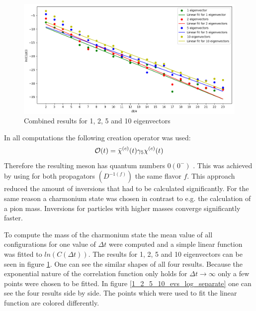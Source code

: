     \begin{figure}[H]
        \centering
        \includegraphics[width=1\textwidth]{images/1_2_5_10_evs_log.png}
        \caption{Combined results for 1, 2, 5 and 10 eigenvectors}
        \label{1_2_5_10_evs_log}
    \end{figure}
    
    \noindent
    In all computations the following creation operator was used:
    \begin{equation}
        \mathcal{O}(t) = \bar{\chi}^{(c)}(t)\gamma_5\chi^{(c)}(t)
    \end{equation}
    Therefore the resulting meson has quantum numbers $0(0^-)$ \cite{masses_of_D_mesons}. This was achieved by using for both propagators $(D^{-1(f)})$ the same flavor $f$. This approach reduced the amount of inversions that had to be calculated significantly. For the same reason a charmonium state was chosen in contrast to e.g. the calculation of a pion mass. Inversions for particles with higher masses converge significantly faster.
    
    To compute the mass of the charmonium state the mean value of all configurations for one value of $\Delta t$ were computed and a simple linear function was fitted to $ln(C(\Delta t))$. The results for 1, 2, 5 and 10 eigenvectors can be seen in figure \ref{1_2_5_10_evs_log}. One can see the similar shapes of all four results. Because the exponential nature of the correlation function only holds for $\Delta t \rightarrow \infty$ only a few points were chosen to be fitted. In figure \ref{1_2_5_10_evs_log_separate} one can see the four results side by side. The points which were used to fit the linear function are colored differently.
    
